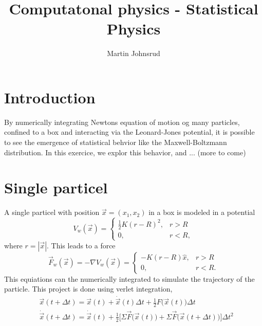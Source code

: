 \documentclass{article}
\title{Computatonal physics - Statistical Physics}
\author{Martin Johnsrud}
\begin{document}
    \maketitle
    
    \section*{Introduction}
    By numerically integrating Newtons equation of motion og many particles, confined to a box and interacting via the Leonard-Jones potential, it is possible to see the emergence of statistical behvior like the Maxwell-Boltzmann distribution. In this exercice, we explor this behavior, and ... (more to come)

    \section*{Single particel}
        A single particel with position $\vec x = (x_1, x_2)$ in a box is modeled in a potential 
        \begin{equation*}
            V_w(\vec x) = 
            \begin{cases}
                \frac{1}{2}K(r - R)^2, & r > R \\
                0, & r < R,
            \end{cases}
        \end{equation*}
        where $r = |\vec x|$. This leads to a force 
        \begin{equation*}
            \vec F_w(\vec x) = -\nabla V_w(\vec x) = 
            \begin{cases}
                -K(r - R)\hat x, & r>R \\
                0, & r<R.
            \end{cases}
        \end{equation*}
        This equiations can the numerically integrated to simulate the trajectory of the particle. This project is done using verlet integration, 
        \begin{align*} 
            & \vec x(t + \Delta t) = \vec x(t) + \dot{\vec x}(t) \Delta t + \frac{1}{2} F\big(\vec x(t)\big) \Delta t \\
            & \dot{\vec x}(t + \Delta t) = \dot{\vec x}(t) + \frac{1}{2} \Big[\Sigma \vec F\big(\vec x(t)\big) + \Sigma \vec F\big(\vec x(t + \Delta t)\big)\Big] \Delta t^2
        \end{align*}
        
\end{document}
